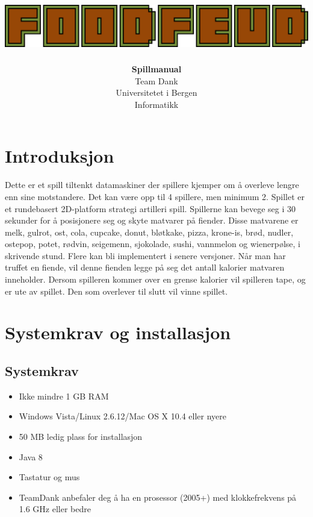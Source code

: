 \documentclass[paper=a4]{article}
\begin{document}
\title{
	\vspace*{10em}
	\includegraphics[width=1.00\textwidth]{images/logo.png}
	\vspace*{3em}
}
\author{\textbf{Spillmanual} \\
Team Dank \\
Universitetet i Bergen \\
Informatikk}
\maketitle
\newpage
\tableofcontents
\newpage

\section{Introduksjon}
Dette er et spill tiltenkt datamaskiner der spillere kjemper om å overleve lengre enn sine motstandere. Det kan være opp til 4 spillere, men minimum 2. 
Spillet er et rundebasert 2D-platform strategi artilleri spill. Spillerne kan bevege seg i 30 sekunder for å posisjonere seg og skyte matvarer på fiender.
Disse matvarene er melk, gulrot, ost, cola, cupcake, donut, bløtkake, pizza, krone-is, brød, nudler, ostepop, potet, rødvin, seigemenn, sjokolade, sushi, vannmelon og wienerpølse, i skrivende stund. Flere kan bli implementert i senere versjoner.
Når man har truffet en fiende, vil denne fienden legge på seg det antall kalorier matvaren inneholder. 
Dersom spilleren kommer over en grense kalorier vil spilleren tape, og er ute av spillet. Den som overlever til slutt vil vinne spillet.


\section{Systemkrav og installasjon}

\subsection{Systemkrav}
\begin{itemize}
	\item{Ikke mindre 1 GB RAM}
	\item{Windows Vista/Linux 2.6.12/Mac OS X 10.4 eller nyere}
	\item{50 MB ledig plass for installasjon}
	\item{Java 8}
	\item{Tastatur og mus}
	\item{TeamDank anbefaler deg å ha en prosessor (2005+) med klokkefrekvens på 1.6 GHz eller bedre}
\end{itemize}
\end{document}
